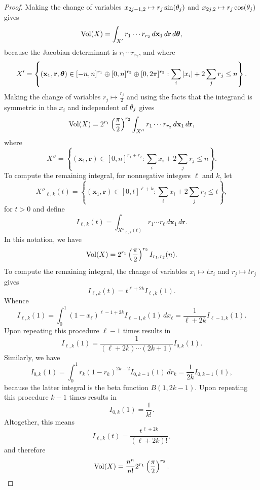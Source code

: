     \begin{proof}
      Making the change of variables \(x_{2j-1,2} \mapsto r_{j}\sin(\theta_{j})\) and \(x_{2j,2} \mapsto r_{j}\cos(\theta_{j})\) gives
      \[
        \operatorname{\mathrm{Vol}}(X) = \int_{X'}r_{1} \cdots r_{r_{2}}\,d\mathbf{x}_{1}\,d\mathbf{r}\,d\boldsymbol{\theta},
      \]
      because the Jacobian determinant is \(r_{1} \cdots r_{r_{2}}\), and where
      \[
        X' = \left\{(\mathbf{x}_{1},\mathbf{r},\boldsymbol{\theta}) \in [-n,n]^{r_{1}} \oplus [0,n]^{r_{2}} \oplus [0,2\pi]^{r_{2}}:\sum_{i}|x_{i}|+2\sum_{j}r_{j} \le n\right\}.
      \]
      Making the change of variables \(r_{j} \mapsto \frac{r_{j}}{2}\) and using the facts that the integrand is symmetric in the \(x_{i}\) and independent of \(\theta_{j}\) gives
      \[
        \operatorname{\mathrm{Vol}}(X) = 2^{r_{1}}\left(\frac{\pi}{2}\right)^{r_{2}}\int_{X''}r_{1} \cdots r_{r_{2}}\,d\mathbf{x}_{1}\,d\mathbf{r},
      \]
      where
      \[
        X'' = \left\{(\mathbf{x}_{1},\mathbf{r}) \in [0,n]^{r_{1}+r_{2}}:\sum_{i}x_{i}+2\sum_{j}r_{j} \le n\right\}.
      \]
      To compute the remaining integral, for nonnegative integers \(\ell\) and \(k\), let
      \[
        X''_{\ell,k}(t) = \left\{(\mathbf{x}_{1},\mathbf{r}) \in [0,t]^{\ell+k}:\sum_{i}x_{i}+2\sum_{j}r_{j} \le t\right\},
      \]
      for \(t > 0\) and define
      \[
        I_{\ell,k}(t) = \int_{X''_{\ell,k}(t)}r_{1} \cdots r_{\ell}\,d\mathbf{x}_{1}\,d\mathbf{r}.
      \]
      In this notation, we have
      \[
        \operatorname{\mathrm{Vol}}(X) = 2^{r_{1}}\left(\frac{\pi}{2}\right)^{r_{2}}I_{r_{1},r_{2}}(n).
      \]
      To compute the remaining integral, the change of variables \(x_{i} \mapsto tx_{i}\) and \(r_{j} \mapsto tr_{j}\) gives
      \[
        I_{\ell,k}(t) = t^{\ell+2k}I_{\ell,k}(1).
      \]
      Whence
      \[
        I_{\ell,k}(1) = \int_{0}^{1}(1-x_{\ell})^{\ell-1+2k}I_{\ell-1,k}(1)\,dx_{\ell} = \frac{1}{\ell+2k}I_{\ell-1,k}(1).
      \]
      Upon repeating this procedure \(\ell-1\) times results in
      \[
        I_{\ell,k}(1) = \frac{1}{(\ell+2k) \cdots (2k+1)}I_{0,k}(1).
      \]
      Similarly, we have
      \[
        I_{0,k}(1) = \int_{0}^{1}r_{k}(1-r_{k})^{2k-2}I_{0,k-1}(1)\,dr_{k} = \frac{1}{2k}I_{0,k-1}(1),
      \]
      because the latter integral is the beta function \(B(1,2k-1)\). Upon repeating this procedure \(k-1\) times results in
      \[
        I_{0,k}(1) = \frac{1}{k!}.
      \]
      Altogether, this means
      \[
        I_{\ell,k}(t) = \frac{t^{\ell+2k}}{(\ell+2k)!},
      \]
      and therefore
      \[
        \operatorname{\mathrm{Vol}}(X) = \frac{n^{n}}{n!}2^{r_{1}}\left(\frac{\pi}{2}\right)^{r_{2}}.
      \]
    \end{proof}

